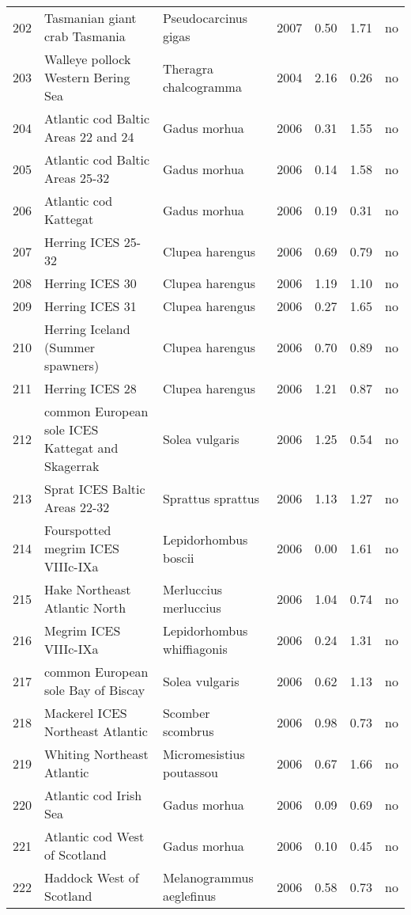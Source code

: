 \begin{table}[ht]
\begin{center}
\begin{tabular}{rllrrrl}
  202 & Tasmanian giant crab Tasmania & Pseudocarcinus gigas & 2007 & 0.50 & 1.71 & no \\
  203 & Walleye pollock Western Bering Sea & Theragra chalcogramma & 2004 & 2.16 & 0.26 & no \\
  204 & Atlantic cod Baltic Areas 22 and 24 & Gadus morhua & 2006 & 0.31 & 1.55 & no \\
  205 & Atlantic cod Baltic Areas 25-32 & Gadus morhua & 2006 & 0.14 & 1.58 & no \\
  206 & Atlantic cod Kattegat & Gadus morhua & 2006 & 0.19 & 0.31 & no \\
  207 & Herring ICES 25-32 & Clupea harengus & 2006 & 0.69 & 0.79 & no \\
  208 & Herring ICES 30 & Clupea harengus & 2006 & 1.19 & 1.10 & no \\
  209 & Herring ICES 31 & Clupea harengus & 2006 & 0.27 & 1.65 & no \\
  210 & Herring Iceland (Summer spawners) & Clupea harengus & 2006 & 0.70 & 0.89 & no \\
  211 & Herring ICES 28 & Clupea harengus & 2006 & 1.21 & 0.87 & no \\
  212 & common European sole ICES Kattegat and Skagerrak & Solea vulgaris & 2006 & 1.25 & 0.54 & no \\
  213 & Sprat ICES Baltic Areas 22-32 & Sprattus sprattus & 2006 & 1.13 & 1.27 & no \\
  214 & Fourspotted megrim ICES VIIIc-IXa & Lepidorhombus boscii & 2006 & 0.00 & 1.61 & no \\
  215 & Hake Northeast Atlantic North & Merluccius merluccius & 2006 & 1.04 & 0.74 & no \\
  216 & Megrim ICES VIIIc-IXa & Lepidorhombus whiffiagonis & 2006 & 0.24 & 1.31 & no \\
  217 & common European sole Bay of Biscay & Solea vulgaris & 2006 & 0.62 & 1.13 & no \\
  218 & Mackerel ICES Northeast Atlantic & Scomber scombrus & 2006 & 0.98 & 0.73 & no \\
  219 & Whiting Northeast Atlantic & Micromesistius poutassou & 2006 & 0.67 & 1.66 & no \\
  220 & Atlantic cod Irish Sea & Gadus morhua & 2006 & 0.09 & 0.69 & no \\
  221 & Atlantic cod West of Scotland & Gadus morhua & 2006 & 0.10 & 0.45 & no \\
  222 & Haddock West of Scotland & Melanogrammus aeglefinus & 2006 & 0.58 & 0.73 & no \\

\end{tabular}
\end{center}
\end{table}

